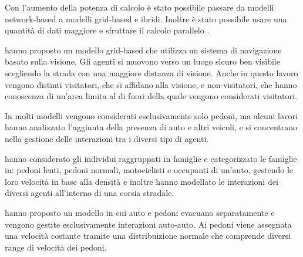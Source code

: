 Con l'aumento della potenza di calcolo è stato possibile passare da modelli network-based a modelli grid-based e ibridi.
Inoltre è stato possibile usare una quantità di dati maggiore e sfruttare il calcolo parallelo \parencite{wijerathne2013hpc, makinoshima2018enhancing}.

\textcite{wijerathne2013hpc} hanno proposto un modello grid-based che utilizza un sistema di navigazione basato
sulla visione. Gli agenti si muovono verso un luogo sicuro ben visibile scegliendo la strada con una maggiore distanza di visione.
%
Anche in questo lavoro vengono distinti visitatori, che si affidano alla visione, e non-visitatori, che hanno conoscenza di un'area
limita al di fuori della quale vengono considerati visitatori.




In molti modelli vengono considerati esclusivamente solo pedoni, ma alcuni lavori hanno analizzato l'aggiunta della presenza di auto e altri veicoli,
e si concentrano nella gestione delle interazioni tra i diversi tipi di agenti.

\textcite{goto2012tsunami} hanno considerato gli individui raggruppati in famiglie e categorizzato le famiglie in:
pedoni lenti, pedoni normali, motociclisti e occupanti di un'auto, gestendo le loro velocità in base alla densità e inoltre hanno
modellato le interazioni dei diversi agenti all'interno di una corsia stradale.

\textcite{wang2016agent} hanno proposto un modello in cui auto e pedoni evacuano separatamente e vengono gestite esclusivamente interazioni auto-auto. Ai pedoni viene assegnata
una velocità costante tramite una distribuizione normale che comprende diversi range di velocità dei pedoni.

